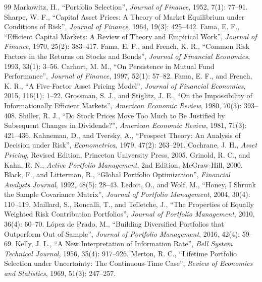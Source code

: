 \begin{thebibliography}{99}
 Markowitz, H., ``Portfolio Selection'', \emph{Journal of Finance}, 1952, 7(1): 77--91.
 Sharpe, W. F., ``Capital Asset Prices: A Theory of Market Equilibrium under Conditions of Risk'', \emph{Journal of Finance}, 1964, 19(3): 425--442.
 Fama, E. F., ``Efficient Capital Markets: A Review of Theory and Empirical Work'', \emph{Journal of Finance}, 1970, 25(2): 383--417.
 Fama, E. F., and French, K. R., ``Common Risk Factors in the Returns on Stocks and Bonds'', \emph{Journal of Financial Economics}, 1993, 33(1): 3--56.
 Carhart, M. M., ``On Persistence in Mutual Fund Performance'', \emph{Journal of Finance}, 1997, 52(1): 57--82.
 Fama, E. F., and French, K. R., ``A Five-Factor Asset Pricing Model'', \emph{Journal of Financial Economics}, 2015, 116(1): 1--22.
 Grossman, S. J., and Stiglitz, J. E., ``On the Impossibility of Informationally Efficient Markets'', \emph{American Economic Review}, 1980, 70(3): 393--408.
 Shiller, R. J., ``Do Stock Prices Move Too Much to Be Justified by Subsequent Changes in Dividends?'', \emph{American Economic Review}, 1981, 71(3): 421--436.
 Kahneman, D., and Tversky, A., ``Prospect Theory: An Analysis of Decision under Risk'', \emph{Econometrica}, 1979, 47(2): 263--291.
 Cochrane, J. H., \emph{Asset Pricing}, Revised Edition, Princeton University Press, 2005.
 Grinold, R. C., and Kahn, R. N., \emph{Active Portfolio Management}, 2nd Edition, McGraw-Hill, 2000.
 Black, F., and Litterman, R., ``Global Portfolio Optimization'', \emph{Financial Analysts Journal}, 1992, 48(5): 28--43.
 Ledoit, O., and Wolf, M., ``Honey, I Shrunk the Sample Covariance Matrix'', \emph{Journal of Portfolio Management}, 2004, 30(4): 110--119.
 Maillard, S., Roncalli, T., and Te\"iletche, J., ``The Properties of Equally Weighted Risk Contribution Portfolios'', \emph{Journal of Portfolio Management}, 2010, 36(4): 60--70.
 L\'opez de Prado, M., ``Building Diversified Portfolios that Outperform Out of Sample'', \emph{Journal of Portfolio Management}, 2016, 42(4): 59--69.
 Kelly, J. L., ``A New Interpretation of Information Rate'', \emph{Bell System Technical Journal}, 1956, 35(4): 917--926.
 Merton, R. C., ``Lifetime Portfolio Selection under Uncertainty: The Continuous-Time Case'', \emph{Review of Economics and Statistics}, 1969, 51(3): 247--257.

\end{thebibliography}

